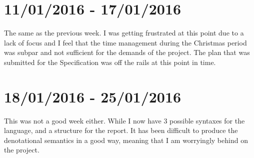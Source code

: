 \documentclass[11pt, a4paper]{article}
\begin{document}
\section{11/01/2016 - 17/01/2016}
The same as the previous week. I was getting frustrated at this point due to a
lack of focus and I feel that the time management during the Christmas period
was subpar and not sufficient for the demands of the project. The plan that was
submitted for the Specification was off the rails at this point in time.

\section{18/01/2016 - 25/01/2016}
This was not a good week either. While I now have 3 possible syntaxes for the
language, and a structure for the report. It has been difficult to produce the
denotational semantics in a good way, meaning that I am worryingly behind on the
project.
\end{document}
